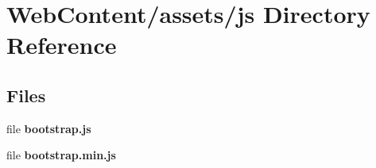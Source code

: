 \section{Web\-Content/assets/js Directory Reference}
\label{dir_c7167e464700d9de335a44370a60396b}
\subsection*{Files}
\begin{DoxyCompactItemize}
\item 
file {\bf bootstrap.\-js}
\item 
file {\bf bootstrap.\-min.\-js}
\end{DoxyCompactItemize}
